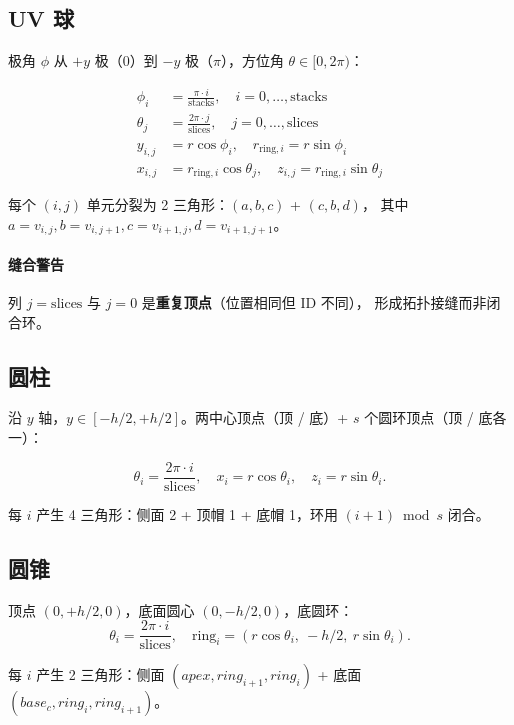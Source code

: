 \documentclass[11pt,a4paper]{article}
\begin{document}
\subsection{UV 球}

极角 $\phi$ 从 $+y$ 极（$0$）到 $-y$ 极（$\pi$），方位角 $\theta \in [0, 2\pi)$：

\begin{align}
  \phi_i &= \frac{\pi \cdot i}{\text{stacks}},\quad i = 0, \dots, \text{stacks} \\
  \theta_j &= \frac{2\pi \cdot j}{\text{slices}},\quad j = 0, \dots, \text{slices} \\
  y_{i,j} &= r \cos\phi_i, \quad r_{\text{ring},i} = r \sin\phi_i \\
  x_{i,j} &= r_{\text{ring},i} \cos\theta_j, \quad z_{i,j} = r_{\text{ring},i} \sin\theta_j
\end{align}

每个 $(i, j)$ 单元分裂为 2 三角形：$(a, b, c)$ + $(c, b, d)$，
其中 $a=v_{i,j}, b=v_{i,j+1}, c=v_{i+1,j}, d=v_{i+1,j+1}$。

\paragraph{缝合警告} 列 $j = \text{slices}$ 与 $j = 0$ 是\textbf{重复顶点}（位置相同但 ID 不同），
形成拓扑接缝而非闭合环。

\subsection{圆柱}

沿 $y$ 轴，$y \in [-h/2, +h/2]$。两中心顶点（顶 / 底）+ $s$ 个圆环顶点（顶 / 底各一）：

\[
  \theta_i = \frac{2\pi \cdot i}{\text{slices}},\quad
  x_i = r \cos\theta_i,\quad
  z_i = r \sin\theta_i.
\]

每 $i$ 产生 4 三角形：侧面 2 + 顶帽 1 + 底帽 1，环用 $(i+1) \bmod s$ 闭合。

\subsection{圆锥}

顶点 $(0, +h/2, 0)$，底面圆心 $(0, -h/2, 0)$，底圆环：
\[
  \theta_i = \frac{2\pi \cdot i}{\text{slices}},\quad
  \text{ring}_i = (r\cos\theta_i,\ -h/2,\ r\sin\theta_i).
\]

每 $i$ 产生 2 三角形：侧面 $(apex, ring_{i+1}, ring_i)$ + 底面 $(base_c, ring_i, ring_{i+1})$。
\end{document}
